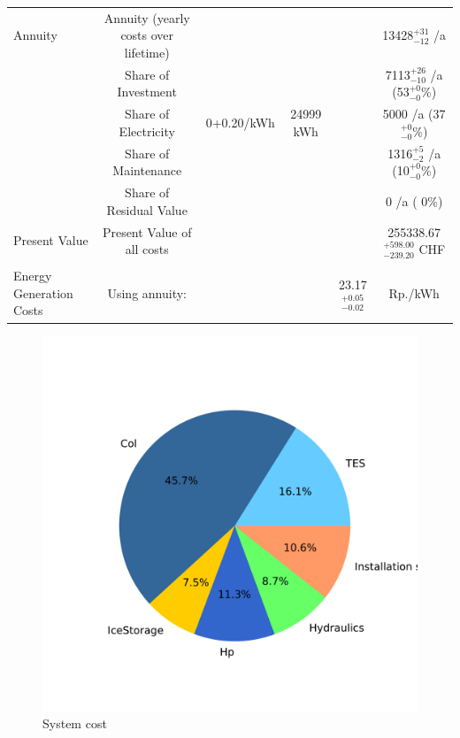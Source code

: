 \documentclass[english]{SPFShortReport}
\begin{document}
\begin{table}[!ht]
\begin{adjustbox}{max width =\textwidth}
\begin{tabular}{l | c c c c c }
Annuity & Annuity (yearly costs over lifetime)  &&& & 13428$^{\mathrm{+31}}_{\mathrm{-12}}$ /a  \\
 & Share of Investment & &&& 7113$^{\mathrm{+26}}_{\mathrm{-10}}$ /a (53$^{\mathrm{+ 0}}_{\mathrm{- 0}}$\%) \\
 & Share of Electricity & 0+0.20/kWh & 24999 kWh &  & 5000 /a (37$^{\mathrm{+ 0}}_{\mathrm{- 0}}$\%)\\
 & Share of Maintenance & &&& 1316$^{\mathrm{+ 5}}_{\mathrm{- 2}}$ /a (10$^{\mathrm{+ 0}}_{\mathrm{- 0}}$\%)\\ 
 & Share of Residual Value &&& &  0 /a ( 0\%)\\
Present Value  & Present Value of all costs  & &&& 255338.67$^{\mathrm{+598.00}}_{\mathrm{-239.20}}$ CHF \\
\hline \\ 
 Energy Generation Costs & Using annuity: &&& 23.17$^{\mathrm{+0.05}}_{\mathrm{-0.02}}$ & Rp./kWh \\
\hline
\hline
\end{tabular}
\end{adjustbox}
\label{CostsTable}
\end{table}
\begin{figure}[!htbp]
\begin{center}
\includegraphics[width=1\textwidth]{costShare-HydD_mfb30_real_dryN-CityBAS_dryNAc1.0x58.086Vice0.2x58.086HP1.0x18.442-Year0.pdf}
\caption{System cost}
\label{systemCost}
\end{center}
\end{figure}
\end{document}
